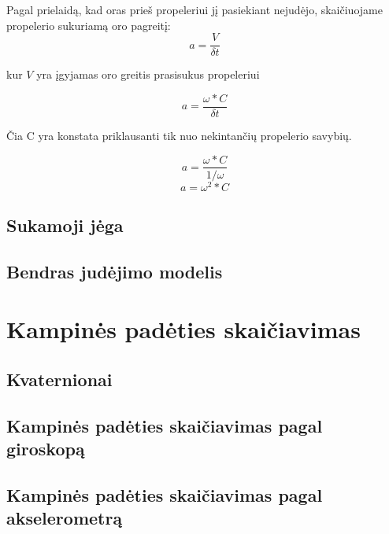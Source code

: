 \documentclass[12pt, a4paper, lithuanian, final]{article}
\begin{document}
Pagal prielaidą, kad oras prieš propeleriui jį pasiekiant nejudėjo, skaičiuojame propelerio sukuriamą oro pagreitį:
\begin{equation}
	a = \dfrac{V}{\delta t}
\end{equation}

kur $V$ yra įgyjamas oro greitis prasisukus propeleriui

\begin{equation}
	a = \dfrac{ \omega * C}{\delta t}
\end{equation}

Čia C yra konstata priklausanti tik nuo nekintančių propelerio savybių.

\begin{equation}
	a = \dfrac{\omega * C}{ 1 / \omega}
\end{equation}
\begin{equation}
	a = \omega ^ 2 * C
\end{equation}










\subsection{Sukamoji jėga}





\subsection{Bendras judėjimo modelis}



\section{Kampinės padėties skaičiavimas}
\subsection{Kvaternionai}
\subsection{Kampinės padėties skaičiavimas pagal giroskopą}
\subsection{Kampinės padėties skaičiavimas pagal akselerometrą}
\end{document}
